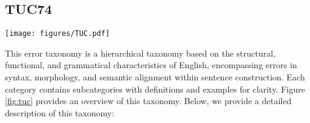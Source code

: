 \subsection{TUC74}
\label{subsec: gooficon}
\begin{figure*}[htbp]
    \centering
    \texttt{[image: figures/TUC.pdf]}
    \caption{Overview of the TUC74 Error Classification Taxonomy. The horizontal ellipsis indicates that the category has additional subcategories not fully expanded here.}
    \label{fig:tuc}
\end{figure*}

This error taxonomy is a hierarchical taxonomy based on the structural, functional, and grammatical characteristics of English, encompassing errors in syntax, morphology, and semantic alignment within sentence construction.
Each category contains subcategories with definitions and examples for clarity. Figure \ref{fig:tuc} provides an overview of this taxonomy. Below, we provide a detailed description of this taxonomy:

